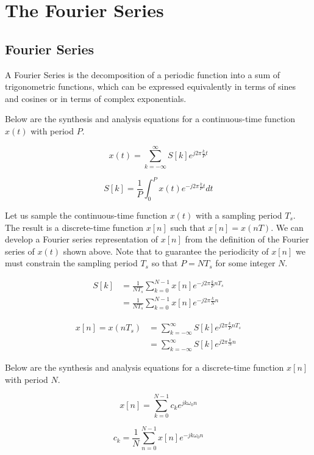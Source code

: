 \chapter{The Fourier Series}

\section{Fourier Series}
A Fourier Series is the decomposition of a periodic function into a sum of trigonometric functions, which can be expressed equivalently in terms of sines and cosines or in terms of complex exponentials.

Below are the synthesis and analysis equations for a continuous-time function $x(t)$ with period $P$.

\begin{equation}
	x(t) = \sum_{k=-\infty}^{\infty} S[k] e^{j 2 \pi \frac{k}{P} t}
\end{equation}

\begin{equation}
	S[k] = \frac{1}{P} \int_{0}^{P} x(t) e^{-j 2 \pi \frac{k}{P} t} dt
\end{equation}

Let us sample the continuous-time function $x(t)$ with a sampling period $T_s$. The result is a discrete-time function $x[n]$ such that $x[n] = x(nT)$. We can develop a Fourier series representation of $x[n]$ from the definition of the Fourier series of $x(t)$ shown above. Note that to guarantee the periodicity of $x[n]$ we must constrain the sampling period $T_s$ so that $P = NT_s$ for some integer $N$.	

\begin{align*}
	S[k] &= \frac{1}{NT_s} \sum_{k = 0}^{N - 1} x[n] e^{-j 2 \pi \frac{k}{P} n T_s} \\
	&= \frac{1}{NT_s} \sum_{k = 0}^{N - 1} x[n] e^{-j 2 \pi \frac{k}{N} n}
\end{align*}

\begin{align*}
	x[n] = x(nT_s) &= \sum_{k = -\infty}^{\infty} S[k] e^{j 2 \pi \frac{k}{P} n T_s} \\
	&= \sum_{k = -\infty}^{\infty} S[k] e^{j 2 \pi \frac{k}{N} n}
\end{align*}

Below are the synthesis and analysis equations for a discrete-time function $x[n]$ with period $N$.

\begin{equation}
	x[n] = \sum_{k = 0}^{N - 1} c_k e^{j k \omega_0 n}
\end{equation}

\begin{equation}
	c_k = \frac{1}{N} \sum_{n = 0}^{N - 1} x[n] e^{-j k \omega_0 n}
\end{equation}